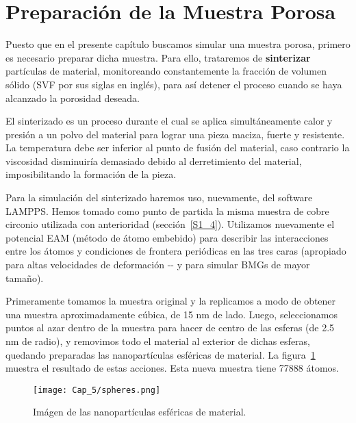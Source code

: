 
\section{Preparación de la Muestra Porosa}
\label{S5_3}

Puesto que en el presente capítulo buscamos simular una muestra porosa, primero es necesario preparar dicha muestra. Para ello,
trataremos de \textbf{sinterizar} partículas de material, monitoreando constantemente la fracción de volumen sólido (SVF
por sus siglas en inglés), para así detener el proceso cuando se haya alcanzado la porosidad deseada.

El sinterizado es un proceso durante el cual se aplica simultáneamente calor y presión a un polvo
del material para lograr una pieza maciza, fuerte y resistente. La temperatura debe ser inferior al punto de fusión del material,
caso contrario la viscosidad disminuiría demasiado debido al derretimiento del material, imposibilitando la formación de la pieza.

Para la simulación del sinterizado haremos uso, nuevamente, del software LAMPPS. Hemos tomado como punto de partida la misma muestra
de cobre circonio utilizada con anterioridad (sección~\ref{S1_4}). Utilizamos nuevamente el potencial EAM (método de átomo embebido) \citep{daw84}
para describir las interacciones entre los átomos y condiciones de frontera periódicas en las tres caras (apropiado para altas velocidades
de deformación -\cite{bringa05}- y para simular BMGs de mayor tamaño).

Primeramente tomamos la muestra original y la replicamos a modo de obtener una muestra aproximadamente cúbica, de 15 nm de lado. 
Luego, seleccionamos puntos
al azar dentro de la muestra para hacer de centro de las esferas (de 2.5 nm de radio), y removimos todo el material al exterior de dichas esferas,
quedando preparadas las nanopartículas esféricas de material. La figura~\ref{C5:fg:sintInicial} muestra el resultado de estas
acciones. Esta nueva muestra tiene 77888 átomos.

\begin{figure}[h!]
  \centering
  \texttt{[image: Cap\_5/spheres.png]}
  \caption[Nanopartículas esféricas de material]{Imágen de las nanopartículas esféricas de material.}
  \label{C5:fg:sintInicial}
\end{figure}


